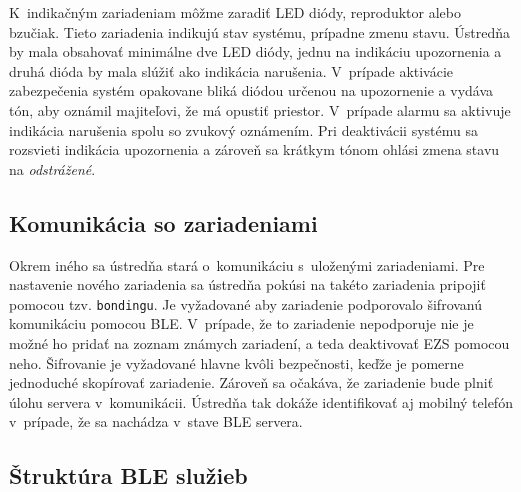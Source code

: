 K~indikačným zariadeniam môžme zaradiť LED diódy, reproduktor alebo bzučiak. Tieto zariadenia indikujú stav systému, prípadne zmenu stavu. Ústredňa by mala obsahovať minimálne dve LED diódy, jednu na indikáciu upozornenia a druhá dióda by mala slúžiť ako indikácia narušenia. V~prípade aktivácie zabezpečenia systém opakovane bliká diódou určenou na upozornenie a vydáva tón, aby oznámil majiteľovi, že má opustiť priestor. V~prípade alarmu sa aktivuje indikácia narušenia spolu so zvukový oznámením. Pri deaktivácii systému sa rozsvieti indikácia upozornenia a zároveň sa krátkym tónom ohlási zmena stavu na \textit{odstrážené}.

\subsection{Komunikácia so zariadeniami}

Okrem iného sa ústredňa stará o~komunikáciu s~uloženými zariadeniami. Pre nastavenie nového zariadenia sa ústredňa pokúsi na takéto zariadenia pripojiť pomocou tzv. \texttt{bondingu}. Je vyžadované aby zariadenie podporovalo šifrovanú komunikáciu pomocou BLE. V~prípade, že to zariadenie nepodporuje nie je možné ho pridať na zoznam známych zariadení, a teda deaktivovať EZS pomocou neho. Šifrovanie je vyžadované hlavne kvôli bezpečnosti, keďže je pomerne jednoduché skopírovať zariadenie. Zároveň sa očakáva, že zariadenie bude plniť úlohu servera v~komunikácii. Ústredňa tak dokáže identifikovať aj mobilný telefón v~prípade, že sa nachádza v~stave BLE servera.

\subsection{Štruktúra BLE služieb}\label{sec:BLE_struc}

